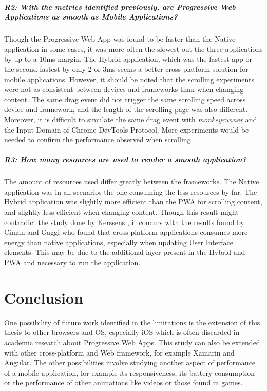 \paragraph{R2: With the metrics identified previously, are Progressive Web Applications as smooth as Mobile Applications?}
Though the Progressive Web App was found to be faster than the Native application in some cases, it was more often the slowest out the three applications by up to a 10ms margin. The Hybrid application, which was the fastest app or the second fastest by only 2 or 3ms seems a better cross-platform solution for mobile applications. \newline
However, it should be noted that the scrolling experiments were not as consistent between devices and frameworks than when changing content. The same drag event did not trigger the same scrolling speed across device and framework, and the length of the scrolling page was also different. Moreover, it is difficult to simulate the same drag event with \textit{monkeyrunner} and the Input Domain of Chrome DevTools Protocol. More experiments would be needed to confirm the performance observed when scrolling.

\paragraph{R3: How many resources are used to render a smooth application?}
The amount of resources used differ greatly between the frameworks. The Native application was in all scenarios the one consuming the less resources by far. The Hybrid application was slightly more efficient than the PWA for scrolling content, and slightly less efficient when changing content. Though this result might contradict the study done by Kerssens \cite{PWAapplicability}, it concurs with the results found by Ciman and Gaggi \cite{ciman2017empirical} who found that cross-platform applications consumes more energy than native applications, especially when updating User Interface elements. This may be due to the additional layer present in the Hybrid and PWA and necessary to run the application.
\fi

\chapter{Conclusion}

One possibility of future work identified in the limitations is the extension of this thesis to other browsers and OS, especially iOS which is often discarded in academic research about Progressive Web Apps. This study can also be extended with other cross-platform and Web framework, for example Xamarin and Angular.\newline
The other possibilities involve studying another aspect of performance of a mobile application, for example its responsiveness, its battery consumption or the performance of other animations like videos or those found in games.
